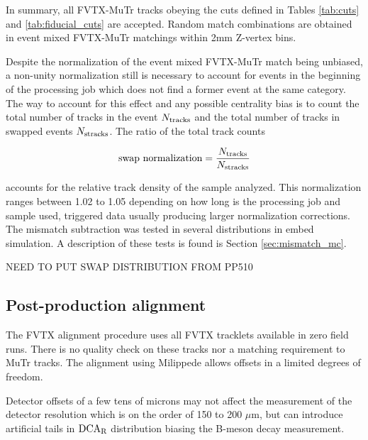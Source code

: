 \documentclass[12pt]{article}
\newcommand{\dcar}{$\rm{DCA}_{R}$ }
\begin{document}
In summary, all  FVTX-MuTr tracks obeying the cuts defined in Tables \ref{tab:cuts} and \ref{tab:fiducial_cuts} are accepted. Random match combinations 
are obtained in event mixed FVTX-MuTr matchings within 2mm Z-vertex bins.

Despite the normalization of the event mixed FVTX-MuTr match being unbiased, a non-unity normalization still is necessary to account for events in the beginning 
of the processing job which does not find a former event at the same category. The way to account for this effect and any possible centrality bias is to count the
 total number of tracks in the event $N_{\rm tracks}$ and the total number of tracks in swapped events $N_{\rm stracks}$. The ratio of the total track counts

\begin{equation}
\label{eq:swap_norm}
   \textrm{swap normalization} = \frac{N_{\rm tracks}}{N_{\rm stracks}}
\end{equation}

\noindent accounts for the relative track density of the sample analyzed. This normalization ranges between 1.02 to 1.05 depending on how long is the processing 
job and sample used,  triggered data usually producing larger normalization corrections. The mismatch subtraction was tested in several distributions in embed simulation. A description of these tests is found is Section \ref{sec:mismatch_mc}.

{\color{red} NEED TO PUT SWAP DISTRIBUTION FROM PP510}

\pagebreak
\newpage


\subsection{Post-production alignment}
\label{sec:postprod_alignment}

The FVTX alignment procedure uses all FVTX tracklets available in zero field runs. There is no quality check on these tracks nor a matching requirement to MuTr tracks. 
The alignment using Milippede allows offsets in a limited degrees of freedom.

Detector offsets of a few tens of microns may not affect the measurement of the detector resolution which is on the order of 150 to 200 $\mu$m, 
but can introduce artificial tails in \dcar distribution biasing the B-meson decay measurement. 
\end{document}
